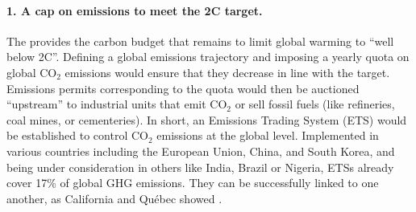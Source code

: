 \documentclass[12pt,english]{article}
\begin{document}
\paragraph*{1. A cap on emissions to meet the 2\textdegree{}C target.} 

The \citet{ipcc_climate_2021} provides the carbon budget that remains to limit global warming to ``well below 2\textdegree{}C''. 
Defining a global emissions trajectory and imposing a yearly quota on global CO$_\text{2}$ emissions would ensure that they decrease in line with the target. 
Emissions permits corresponding to the quota would then be auctioned ``upstream'' to industrial units that emit CO$_\text{2}$ or sell fossil fuels (like refineries, coal mines, or cementeries). 
In short, an Emissions Trading System (ETS) would be established to control CO$_\text{2}$ emissions at the global level. 
Implemented in various countries including the European Union, China, and South Korea, and being under consideration in others like India, Brazil or Nigeria, ETSs already cover 17\% of global GHG emissions. They can be successfully linked to one another, as California and Québec showed \citep{icap_emissions_2023}. 
\end{document}
